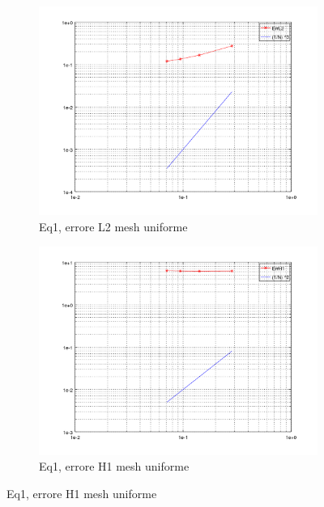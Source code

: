 \documentclass[12pt,a4paper]{report}
\theoremstyle{theorem}
\theoremstyle{theorem}
\theoremstyle{definition}
\begin{document}
\begin{figure}[!h]
	\centering
	\begin{subfigure}[b]{0.49\textwidth}
    		\includegraphics[width=\textwidth]{Eq1-L2U.png}
    		\caption{Eq1, errore L2 mesh uniforme}
    	\end{subfigure}
    	\begin{subfigure}[b]{0.49\textwidth}
    		\includegraphics[width=\textwidth]{Eq1-H1U.png}
    		\caption{Eq1, errore H1 mesh uniforme}
    	\end{subfigure}
\end{figure}
\end{document}
